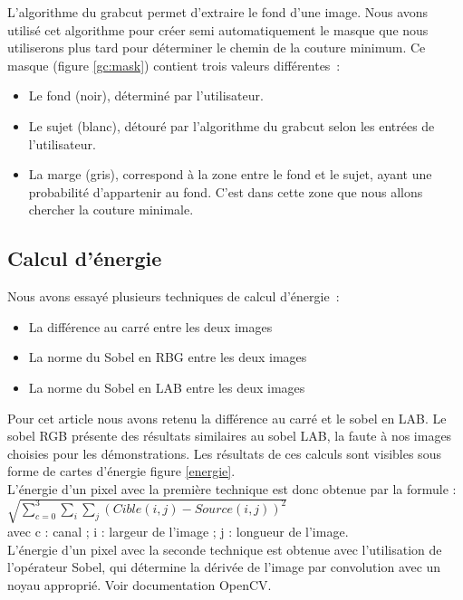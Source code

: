 \documentclass[a4paper]{article}
\begin{document}
L'algorithme du grabcut permet d'extraire le fond d'une image. 
Nous avons utilisé cet algorithme pour créer semi automatiquement le masque que nous utiliserons plus tard
pour déterminer le chemin de la couture minimum. 
Ce masque (figure \ref{gc:mask}) contient trois valeurs différentes~:

\begin{itemize}
    \item Le fond (noir), déterminé par l'utilisateur. 
    \item Le sujet (blanc), détouré par l'algorithme du grabcut selon les entrées de l'utilisateur.
    \item La marge (gris), correspond à la zone entre le fond et le sujet, ayant une probabilité d'appartenir au fond. C'est dans cette zone que nous allons chercher la couture minimale.
\end{itemize}

\subsection{Calcul d'énergie}

Nous avons essayé plusieurs techniques de calcul d'énergie~:

\begin{itemize}
    \item La différence au carré entre les deux images
    \item La norme du Sobel en RBG entre les deux images
    \item La norme du Sobel en LAB entre les deux images
\end{itemize}

Pour cet article nous avons retenu la différence au carré et le sobel en LAB. Le sobel RGB présente des résultats
similaires au sobel LAB, la faute à nos images choisies pour les démonstrations. %
Les résultats de ces calculs sont visibles sous forme de cartes d'énergie figure \ref{energie}.
\\
L'énergie d'un pixel avec la première technique est donc obtenue par la formule : \\
\begin {math}
\sqrt {\sum_{c=0}^{3} \sum_{i} \sum_{j} (Cible (i,j) - Source (i,j))^2}
\end {math}
\\
avec c : canal ; i : largeur de l'image ; j : longueur de l'image. \\
L'énergie d'un pixel avec la seconde technique est obtenue avec l'utilisation de l'opérateur Sobel, qui détermine la dérivée de l'image par convolution avec un noyau approprié. Voir documentation OpenCV.
\end{document}
